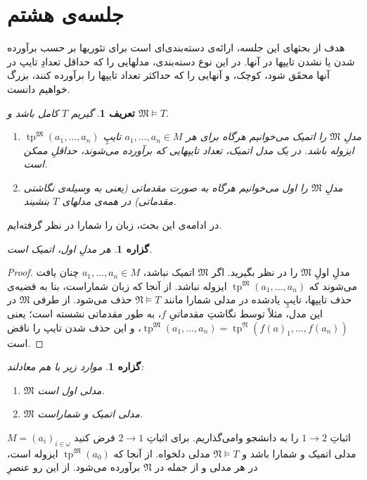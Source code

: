 \documentclass[12pt,a4paper]{article}
\theoremstyle{colorhead}
\newtheorem{prop}[thm]{گزاره}
\newtheorem{defn}[thm]{تعریف}
\DeclareMathOperator{\tp}{tp}
\begin{document}
\section{جلسه‌ی هشتم}
هدف از بحثهای این جلسه، ارائه‌ی دسته‌بندی‌ای است برای تئوریها بر حسب
برآورده شدن یا نشدن تایپها در آنها. در این نوع دسته‌بندی، مدلهایی را که حداقل
تعدادِ تایپ در آنها محقَق شود، کوچک، و آنهایی را که 
حداکثر تعداد تایپها را برآورده کنند، بزرگ خواهیم دانست. 
\begin{defn}
گیریم
$T$
کامل باشد و 
$\mathfrak{M}\models T$.
\begin{enumerate}
\item 
مدلِ
$\mathfrak{M}$
را 
اتمیک
می‌خوانیم هرگاه برای هر
$a_1,\ldots,a_n\in M$
تایپِ
$\tp^\mathfrak{M}(a_1,\ldots,a_n)$
ایزوله باشد. 
در یک مدل اتمیک، تعداد تایپهایی که برآورده می‌شوند، حداقلِ ممکن است. 
\item
مدلِ
 $\mathfrak{M}$
را اول 
می‌خوانیم هرگاه به صورت مقدماتی 
(یعنی به وسیله‌ی نگاشتی مقدماتی)
 در همه‌ی مدلهای
$T$
بنشیند.
\end{enumerate}
\end{defn}
در ادامه‌ی این بحث، زبان را شمارا در نظر گرفته‌ایم.
\begin{prop}
هر مدلِ اول، اتمیک است.
\end{prop}
\begin{proof}
مدلِ
اولِ
$\mathfrak{M}$
را در نظر بگیرید. اگر
$\mathfrak{M}$
اتمیک نباشد، 
$a_1,\ldots,a_n\in M$
چنان یافت می‌شوند که 
$\tp^\mathfrak{M}(a_1,\ldots,a_n)$
ایزوله نباشد. از آنجا که زبان شماراست، بنا به قضیه‌ی حذف تایپها،
تایپِ یادشده در
مدلی شمارا مانند
$\mathfrak{N}\models T$
حذف می‌شود. از طرفی
$\mathfrak{M}$
در این مدل، مثلاً توسط نگاشتِ
مقدماتیِ
$f$،
به طور مقدماتی نشسته است؛ یعنی
\mbox{$\tp^\mathfrak{M}(a_1,\ldots,a_n)=\tp^\mathfrak{N}(f(a)_1,\ldots,f(a_n))$}،
و این حذف شدن تایپ را ناقض است. 
\end{proof}
\begin{prop}
موارد زیر با هم معادلند:
\begin{enumerate}
\item 
$\mathfrak{M}$
مدلی اول است.
\item 
$\mathfrak{M}$
مدلی اتمیک و شماراست.
\end{enumerate}
\end{prop}
اثباتِ 
$1\to 2$
را به دانشجو وامی‌گذاریم. برای اثباتِ
$2\to 1$
فرض کنید 
$M=(a_i)_{i\in \omega}$
مدلی اتمیک  و شمارا باشد و 
$\mathfrak{N}\models T$
مدلی دلخواه. از آنجا که
$\tp^\mathfrak{M}(a_0)$
ایزوله است، در هر مدلی و از جمله در
$\mathfrak{N}$
برآورده می‌شود. از این رو عنصرِ
\end{document}
